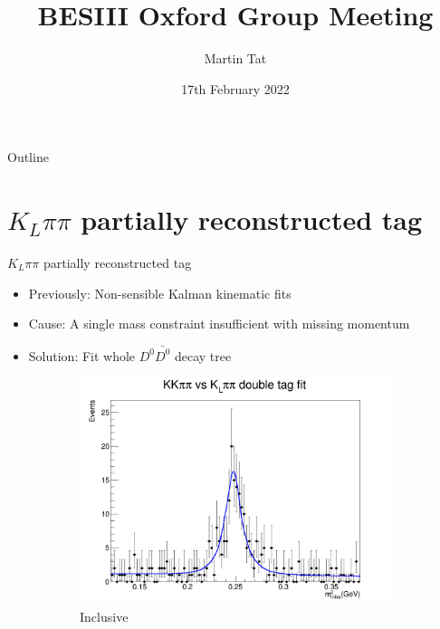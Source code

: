 \documentclass{beamer}
\title[BESIII Oxford]{BESIII Oxford Group Meeting}
\author{Martin Tat}
\institute{Oxford LHCb}
\date{17th February 2022}
\begin{document}
\begin{frame}
  \titlepage
\end{frame}

\begin{frame}{Outline}
  \tableofcontents
\end{frame}

\section{\texorpdfstring{$K_L\pi\pi$}{KLpipi} partially reconstructed tag}

\begin{frame}{$K_L\pi\pi$ partially reconstructed tag}
  \begin{itemize}
    \setlength\itemsep{1.0em}
    \item{Previously: Non-sensible Kalman kinematic fits}
    \item{Cause: A single mass constraint insufficient with missing momentum}
    \item{Solution: Fit whole $D^0\bar{D^0}$ decay tree}
  \end{itemize}
  \begin{figure}
    \centering
    \begin{subfigure}{0.49\textwidth}
      \centering
      \includegraphics[width=\textwidth]{Plots/KLpipi_Inclusive_DoubleTagYield.png}
      \caption{Inclusive}
    \end{subfigure}%
    \begin{subfigure}{0.49\textwidth}
      \centering

\end{subfigure}
\end{figure}
\end{frame}
\end{document}
